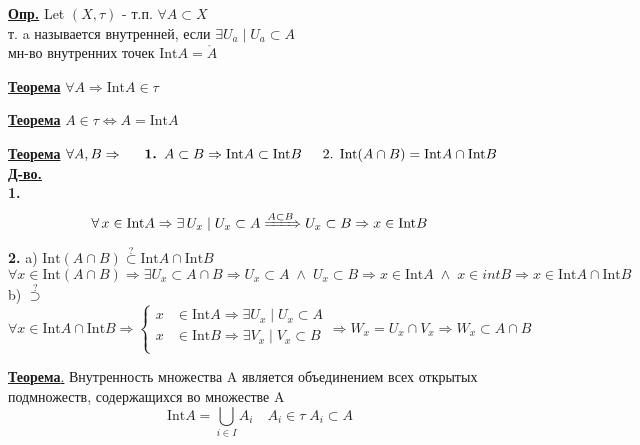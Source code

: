 \documentclass[12pt]{article}
\begin{document}
\underline{\textbf{Опр.}} Let $(X, \tau) $ - т.п. $\forall A \subset X$ \\ 
т. a называется внутренней, если $\exists U_a \; | \; U_a \subset A$ \\
мн-во внутренних точек $\text{Int}A = \mathring{A}$

\underline{\textbf{Теорема}} $\forall A \Rightarrow \text{Int}A \in \tau$

\underline{\textbf{Теорема}} $ A \in \tau \Leftrightarrow A = \text{Int}A $

\underline{\textbf{Теорема}} $ \forall A, B \Rightarrow \\
    \indent \textbf{\textbf{1.} } A \subset B \Rightarrow \text{Int}A \subset \text{Int}B \\
    \indent \text{2. } \text{Int}(A \cap B) = \text{Int}A \cap \text{Int}B\\
$
\underline{\textbf{Д-во.}} \\
\textbf{1.} 
\begin{equation*}
    \forall \, x \in \text{Int}A \Rightarrow \exists \, U_x \; | \; U_x \subset A
    \xRightarrow{A \subset B} U_x \subset B \Rightarrow x \in \text{Int}B
\end{equation*}
\textbf{2.} a) $ \text{Int}(A \cap B) \stackrel{?}{\subset} \text{Int}A \cap \text{Int}B $\\
\begin{equation*}
    \forall x \in \text{Int}(A \cap B) \Rightarrow \exists U_x \subset A \cap B
    \Rightarrow U_x \subset A \; \land \; U_x \subset B \Rightarrow
    x \in \text{Int}A \; \land \; x \in intB \Rightarrow x \in \text{Int}A \cap \text{Int}B
\end{equation*}
b) $ \stackrel{?}{\supset} $
\begin{equation*}
    \forall x \in \text{Int}A \cap \text{Int}B \Rightarrow \begin{cases}
        x &\in \text{Int}A \Rightarrow \exists U_x \; | \; U_x \subset A\\
        x &\in \text{Int}B \Rightarrow \exists V_x \; | \; V_x \subset B\\
    \end{cases}
    \Rightarrow W_x = U_x \cap V_x \Rightarrow W_x \subset A \cap B
\end{equation*}

\underline{\textbf{Теорема}.} Внутренность множества A является объединением всех открытых
подмножеств, содержащихся во множестве A \\
\[ \text{Int}A = \bigcup_{i \in I}A_i \quad A_i \in \tau \; A_i \subset A \]
\end{document}
